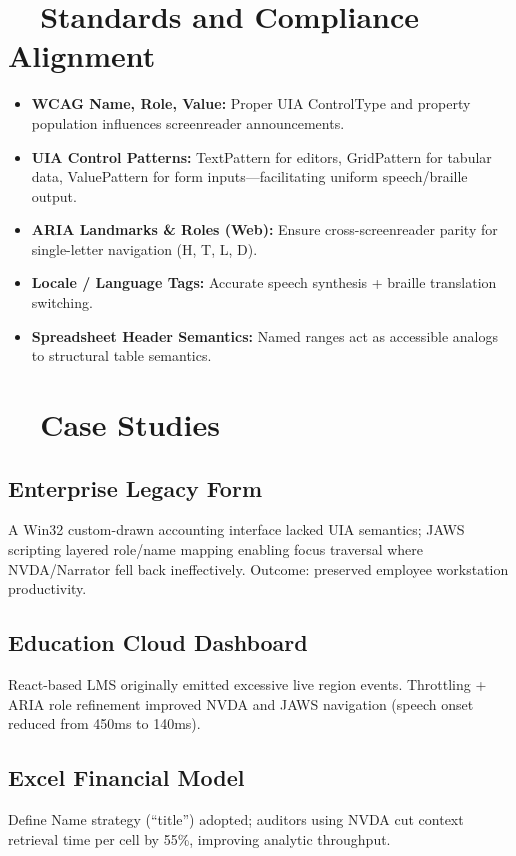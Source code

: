 \section{~~Standards and Compliance Alignment}
\label{sec:sr25-standards}
\begin{itemize}
	\item \textbf{WCAG Name, Role, Value:} Proper UIA ControlType and property population influences screenreader announcements.
	\item \textbf{UIA Control Patterns:} TextPattern for editors, GridPattern for tabular data, ValuePattern for form inputs—facilitating uniform speech/braille output.
	\item \textbf{ARIA Landmarks \& Roles (Web):} Ensure cross-screenreader parity for single-letter navigation (H, T, L, D).
	\item \textbf{Locale / Language Tags:} Accurate speech synthesis + braille translation switching.
	\item \textbf{Spreadsheet Header Semantics:} Named ranges act as accessible analogs to structural table semantics.
\end{itemize}

\section{~~Case Studies}
\label{sec:sr25-case-studies}
\subsection*{Enterprise Legacy Form}
A Win32 custom-drawn accounting interface lacked UIA semantics; JAWS scripting layered role/name mapping enabling focus traversal where NVDA/Narrator fell back ineffectively. Outcome: preserved employee workstation productivity.

\subsection*{Education Cloud Dashboard}
React-based LMS originally emitted excessive live region events. Throttling + ARIA role refinement improved NVDA and JAWS navigation  (speech onset reduced from 450ms to 140ms).

\subsection*{Excel Financial Model}
Define Name strategy (“title”) adopted; auditors using NVDA cut context retrieval time per cell by 55\%, improving analytic throughput.

